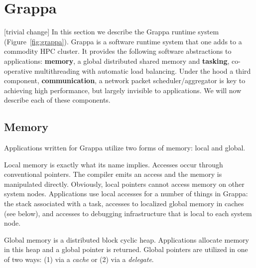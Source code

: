 \section{Grappa} \label{sec:grappa}
[trivial change]
In this section we describe the Grappa runtime system (Figure~\ref{fig:grappa}).  Grappa is a software runtime system that one adds to a commodity HPC cluster.  It provides the following software abstractions to applications: \textbf{memory}, a global distributed shared memory and \textbf{tasking}, co-operative multithreading with automatic load balancing.  Under the hood a third component, \textbf{communication}, a network packet scheduler/aggregator is key to achieving high performance, but largely invisible to applications.  We will now describe each of these components.

\subsection{Memory}

Applications written for Grappa utilize two forms of memory: local and global.

Local memory is exactly what its name implies.  Accesses occur through conventional pointers.  The compiler emits an access and the memory is manipulated directly.  Obviously, local pointers cannot access memory on other system nodes.  Applications use local accesses for a number of things in Grappa: the stack associated with a task, accesses to localized global memory in caches (see below), and accesses to debugging infrastructure that is local to each system node.

Global memory is a distributed block cyclic heap.  Applications allocate memory in this heap and a global pointer is returned.  Global pointers are utilized in one of two ways: (1) via a \emph{cache} or (2) via a \emph{delegate}.

